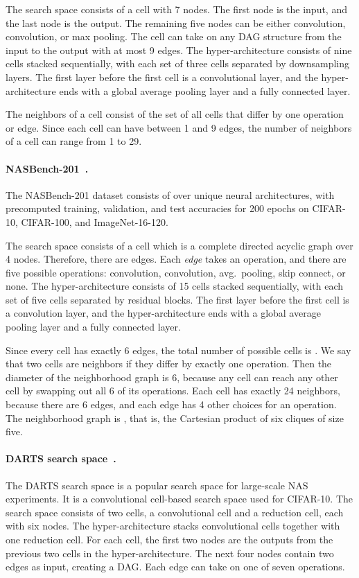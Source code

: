 \documentclass[11pt]{article}
\let\citep\cite
\numberwithin{equation}{section}
\numberwithin{figure}{section}
\theoremstyle{plain}
\theoremstyle{definition}
\begin{document}
The search space consists of a cell with 7 nodes. 
The first node is the input, and the last node is the output. 
The remaining five nodes can be either  convolution, 
 convolution, or  max pooling.
The cell can take on any DAG structure from the input to the output with at most 9 edges.
The hyper-architecture consists of nine cells stacked sequentially, 
with each set of three cells separated by downsampling layers.
The first layer before the first cell is a convolutional layer, 
and the hyper-architecture ends with a global average pooling layer and a fully
connected layer. 

The neighbors of a cell consist of the set of all cells that differ by one operation or edge.
Since each cell can have between 1 and 9 edges, the number of neighbors of a cell can range
from 1 to 29.

\paragraph{NASBench-201~\citep{nasbench201}.}
The NASBench-201 dataset consists of over  unique neural architectures, 
with precomputed training, validation,
and test accuracies for 200 epochs on CIFAR-10, CIFAR-100, and ImageNet-16-120.

The search space consists of a cell which is a complete directed acyclic graph 
over 4 nodes.
Therefore, there are  edges.
Each \emph{edge} takes an operation, and there are five possible operations: 
 convolution,  convolution, 
 avg.\ pooling, skip connect, or none.
The hyper-architecture consists of 15 cells stacked sequentially, with each set of five
cells separated by residual blocks. The first layer before the first cell is a
convolution layer, and the hyper-architecture ends with a global average pooling layer
and a fully connected layer.

Since every cell has exactly 6 edges, the total number of possible cells is .
We say that two cells are neighbors if they differ by exactly one operation.
Then the diameter of the neighborhood graph is 6, because any cell can reach
any other cell by swapping out all 6 of its operations.
Each cell has exactly 24 neighbors, because there are 6 edges, and each edge
has 4 other choices for an operation.
The neighborhood graph is , that is, the Cartesian product
of six cliques of size five.


\paragraph{DARTS search space~\citep{darts}.}
The DARTS search space is a popular search space for large-scale NAS experiments.
It is a convolutional cell-based search space used for CIFAR-10.
The search space consists of two cells, a convolutional cell and a reduction cell,
each with six nodes. The hyper-architecture stacks  convolutional cells together with one
reduction cell. 
For each cell, the first two nodes are the outputs from the previous two cells in the
hyper-architecture. The next four nodes contain two edges as input, creating a DAG.
Each edge can take on one of seven operations.
\end{document}
